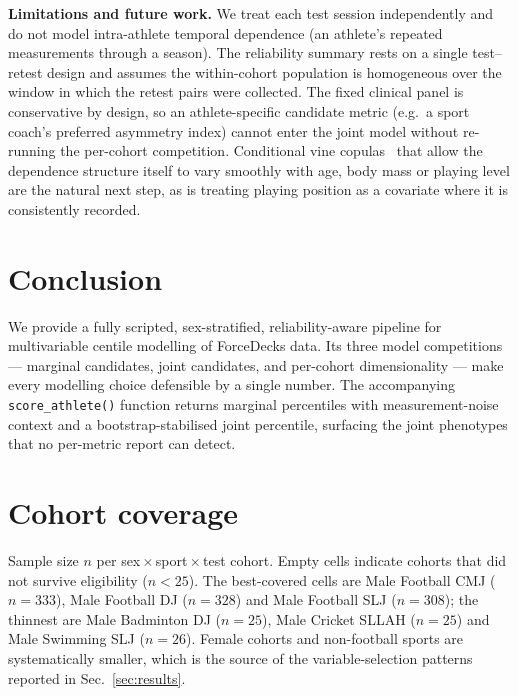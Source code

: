 \documentclass[10pt]{article}
\begin{document}
\textbf{Limitations and future work.} We treat each test session
independently and do not model intra-athlete temporal dependence (an
athlete's repeated measurements through a season). The reliability
summary rests on a single test--retest design and assumes the
within-cohort population is homogeneous over the window in which the
retest pairs were collected. The fixed clinical panel is conservative
by design, so an athlete-specific candidate metric (e.g.\ a sport
coach's preferred asymmetry index) cannot enter the joint model
without re-running the per-cohort competition. Conditional vine
copulas~\cite{czado2022vinereview} that allow the dependence
structure itself to vary smoothly with age, body mass or playing
level are the natural next step, as is treating playing position as
a covariate where it is consistently recorded.

\section{Conclusion}
\label{sec:conclusion}

We provide a fully scripted, sex-stratified, reliability-aware
pipeline for multivariable centile modelling of ForceDecks data. Its
three model competitions --- marginal candidates, joint candidates,
and per-cohort dimensionality --- make every modelling choice
defensible by a single number. The accompanying
\texttt{score\_athlete()} function returns marginal percentiles with
measurement-noise context and a bootstrap-stabilised joint percentile,
surfacing the joint phenotypes that no per-metric report can detect.

\appendix
\renewcommand{\thesection}{\Alph{section}}

\section{Cohort coverage}
\label{app:coverage}
\noindent Sample size $n$ per sex\,$\times$\,sport\,$\times$\,test
cohort. Empty cells indicate cohorts that did not survive eligibility
($n < 25$). The best-covered cells are Male Football CMJ ($n = 333$),
Male Football DJ ($n = 328$) and Male Football SLJ ($n = 308$); the
thinnest are Male Badminton DJ ($n = 25$), Male Cricket SLLAH
($n = 25$) and Male Swimming SLJ ($n = 26$). Female cohorts and
non-football sports are systematically smaller, which is the source
of the variable-selection patterns reported in Sec.~\ref{sec:results}.

\smallskip
\begin{center}\scriptsize

\end{center}
\label{tab:coverage}
\end{document}
